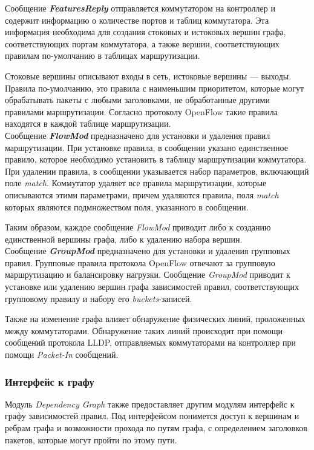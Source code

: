 \documentclass[../thesis.tex]{subfiles}
\begin{document}
Сообщение \textbf{\textit{FeaturesReply}} отправляется коммутатором на контроллер и содержит информацию о количестве портов и таблиц коммутатора.
Эта информация необходима для создания стоковых и истоковых вершин графа, соответствующих портам коммутатора, а также вершин, соответствующих правилам по-умолчанию в таблицах маршрутизации.

Стоковые вершины описывают входы в сеть, истоковые вершины --- выходы.
Правила по-умолчанию, это правила с наименьшим приоритетом, которые могут обрабатывать пакеты с любыми заголовками, не обработанные другими правилами маршрутизации.
Согласно протоколу OpenFlow \cite{openflow15} такие правила находятся в каждой таблице маршрутизации.
\\

Сообщение \textbf{\textit{FlowMod}} предназначено для установки и удаления правил маршрутизации.
При установке правила, в сообщении указано единственное правило, которое необходимо установить в таблицу маршрутизации коммутатора.
При удалении правила, в сообщении указывается набор параметров, включающий поле \textit{match}.
Коммутатор удаляет все правила маршрутизации, которые описываются этими параметрами, причем удаляются правила, поля \textit{match} которых являются подмножеством поля, указанного в сообщении.

Таким образом, каждое сообщение \textit{FlowMod} приводит либо к созданию единственной вершины графа, либо к удалению набора вершин.
\\

Сообщение \textbf{\textit{GroupMod}} предназначено для установки и удаления групповых правил.
Групповые правила протокола OpenFlow отвечают за групповую маршрутизацию и балансировку нагрузки.
Сообщение \textit{GroupMod} приводит к установке или удалению вершин графа зависимостей правил, соответствующих групповому правилу и набору его \textit{buckets}-записей.

Также на изменение графа влияет обнаружение физических линий, проложенных между коммутаторами.
Обнаружение таких линий происходит при помощи сообщений протокола LLDP, отправляемых коммутаторами на контроллер при помощи \textit{Packet-In} сообщений.

\subsubsection{Интерфейс к графу}

Модуль \textit{Dependency Graph} также предоставляет другим модулям интерфейс к графу зависимостей правил.
Под интерфейсом понимется доступ к вершинам и ребрам графа и возможности прохода по путям графа, с определением заголовков пакетов, которые могут пройти по этому пути.
\end{document}
